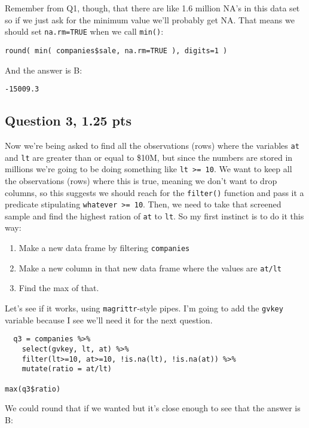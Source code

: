 \documentclass[11pt]{article}
\begin{document}
Remember from Q1, though, that there are like 1.6 million NA's in this data set so if we just ask for the minimum value we'll probably get NA.  That means we should set \texttt{na.rm=TRUE} when we call \texttt{min()}:

\begin{verbatim}
round( min( companies$sale, na.rm=TRUE ), digits=1 )
\end{verbatim}

And the answer is B:
\begin{verbatim}
-15009.3
\end{verbatim}

\subsection*{Question 3, 1.25 pts}
\label{sec:orgcd99d32}
Now we're being asked to find all the observations (rows) where the variables \texttt{at} and \texttt{lt} are greater than or equal to \$10M, but since the numbers are stored in millions we're going to be doing something like \texttt{lt >= 10}.  We want to keep all the observations (rows) where this is true, meaning we don't want to drop columns, so this suggests we should reach for the \texttt{filter()} function and pass it a predicate stipulating \texttt{whatever >= 10}.  Then, we need to take that screened sample and find the highest ration of \texttt{at} to \texttt{lt}.  So my first instinct is to do it this way:

\begin{enumerate}
\item Make a new data frame by filtering \texttt{companies}
\item Make a new column in that new data frame where the values are \texttt{at/lt}
\item Find the max of that.
\end{enumerate}


Let's see if it works, using \texttt{magrittr}-style pipes. I'm going to add the \texttt{gvkey} variable because I see we'll need it for the next question.

\begin{verbatim}
  q3 = companies %>%
    select(gvkey, lt, at) %>%
    filter(lt>=10, at>=10, !is.na(lt), !is.na(at)) %>%
    mutate(ratio = at/lt)

max(q3$ratio)
\end{verbatim}

We could round that if we wanted but it's close enough to see that the answer is B:
\end{document}
